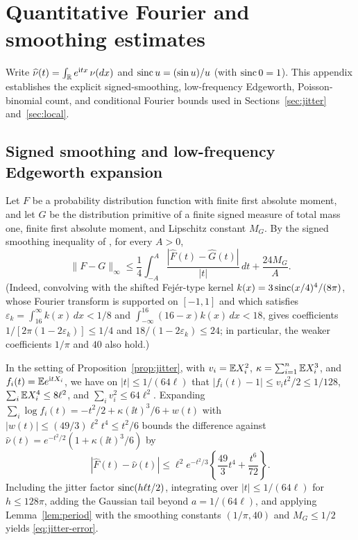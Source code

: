 \section{Quantitative Fourier and smoothing estimates}\label{app:fourier}

Write $\widehat\nu(t)=\int_\mathbb R e^{\mathrm i tx}\,\nu(dx)$ and $\operatorname{sinc} u=(\sin u)/u$
(with $\operatorname{sinc} 0=1$). This appendix establishes the explicit signed-smoothing,
low-frequency Edgeworth, Poisson-binomial count, and conditional Fourier
bounds used in Sections~\ref{sec:jitter} and~\ref{sec:local}.

\subsection{Signed smoothing and low-frequency Edgeworth expansion}

Let $F$ be a probability distribution function with finite first absolute
moment, and let $G$ be the distribution primitive of a finite signed measure
of total mass one, finite first absolute moment, and Lipschitz constant $M_G$.
By the signed smoothing inequality of \citet[Lemma~2.1 and equation~(71)]{HeCheng2026},
for every $A>0$,
\begin{equation}\label{eq:signed-smoothing}
 \|F-G\|_\infty\le\frac14\int_{-A}^A
       \frac{|\widehat F(t)-\widehat G(t)|}{|t|}\,dt+\frac{24M_G}{A}.
\end{equation}
(Indeed, convolving with the shifted Fej\'er-type kernel $k(x)=3\operatorname{sinc}(x/4)^4/(8\pi)$,
whose Fourier transform is supported on $[-1,1]$ and which satisfies
$\varepsilon_k=\int_{16}^\infty k(x)\,dx<1/8$ and $\int_{-\infty}^{16}(16-x)k(x)\,dx<18$,
gives coefficients $1/[2\pi(1-2\varepsilon_k)]\le1/4$ and $18/(1-2\varepsilon_k)\le24$;
in particular, the weaker coefficients $1/\pi$ and $40$ also hold.)

In the setting of Proposition~\ref{prop:jitter}, with $v_i=\mathbb E X_i^2$,
$\kappa=\sum_{i=1}^n\mathbb E X_i^3$, and $f_i(t)=\mathbb E e^{\mathrm i tX_i}$, we have on
$|t|\le1/(64\ell)$ that $|f_i(t)-1|\le v_it^2/2\le1/128$,
$\sum_i\mathbb E X_i^4\le8\ell^2$, and $\sum_i v_i^2\le64\ell^2$. Expanding
$\sum_i\log f_i(t)=-t^2/2+\kappa(\ii t)^3/6+w(t)$ with $|w(t)|\le(49/3)\ell^2t^4\le t^2/6$
bounds the difference against $\widehat\nu(t)=e^{-t^2/2}(1+\kappa(\ii t)^3/6)$ by
\begin{equation}\label{eq:log-error}
 |\widehat F(t)-\widehat\nu(t)|\le\ell^2e^{-t^2/3}\left\{\frac{49}{3}t^4+\frac{t^6}{72}\right\}.
\end{equation}
Including the jitter factor $\operatorname{sinc}(h\ell t/2)$, integrating over
$|t|\le1/(64\ell)$ for $h\le128\pi$, adding the Gaussian tail beyond
$a=1/(64\ell)$, and applying Lemma~\ref{lem:period} with the smoothing
constants $(1/\pi,40)$ and $M_G\le1/2$ yields \eqref{eq:jitter-error}.

